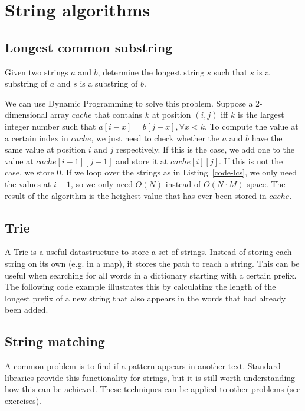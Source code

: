 \section{String algorithms}

\subsection{Longest common substring}
Given two strings $a$ and $b$, determine the longest string $s$ such that $s$ is a substring of $a$ and $s$ is a substring of $b$.

We can use Dynamic Programming to solve this problem. Suppose a 2-dimensional array $cache$ that contains $k$ at position $(i,j)$ iff $k$ is the largest integer number such that $a[i-x]=b[j-x], \forall x < k$. 
To compute the value at a certain index in $cache$, we just need to check whether the $a$ and $b$ have the same value at position $i$ and $j$ respectively. If this is the case, we add one to the value at $cache[i-1][j-1]$ and store it at $cache[i][j]$. If this is not the case, we store 0.
If we loop over the strings as in Listing~\ref{code-lcs}, we only need the values at $i-1$, so we only need $O(N)$ instead of $O(N \cdot M)$ space. The result of the algorithm is the heighest value that has ever been stored in $cache$.



\subsection{Trie}
A Trie is a useful datastructure to store a set of strings. Instead of storing each string on its own (e.g. in a map), it stores the path to reach a string. This can be useful when searching for all words in a dictionary starting with a certain prefix. The following code example illustrates this by calculating the length of the longest prefix of a new string that also appears in the words that had already been added.


\subsection{String matching}
A common problem is to find if a pattern appears in another text. Standard libraries provide this functionality for strings, but it is still worth understanding how this can be achieved. These techniques can be applied to other problems (see exercises).

